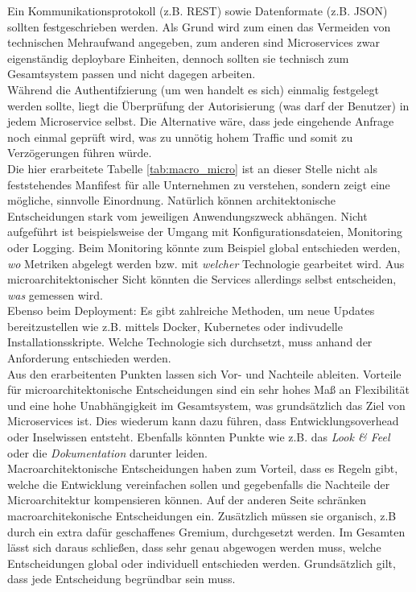 Ein Kommunikationsprotokoll (z.B. REST) sowie Datenformate (z.B. JSON) sollten festgeschrieben werden.\cite{rewe2019mic_ppp} \cite{wolff2018mic_praxis} Als Grund wird zum einen das Vermeiden von technischen Mehraufwand angegeben, zum anderen sind Microservices zwar eigenständig deploybare Einheiten, dennoch sollten sie technisch zum Gesamtsystem passen und nicht dagegen arbeiten. \\

Während die Authentifzierung (um wen handelt es sich) einmalig festgelegt werden sollte, liegt die Überprüfung der Autorisierung (was darf der Benutzer) in jedem Microservice selbst. Die Alternative wäre, dass jede eingehende Anfrage noch einmal geprüft wird, was zu unnötig hohem Traffic und somit zu Verzögerungen führen würde.  \\

Die hier erarbeitete Tabelle  \ref{tab:macro_micro}  ist an dieser Stelle nicht als feststehendes Manfifest für alle Unternehmen zu verstehen, sondern zeigt eine mögliche, sinnvolle Einordnung. Natürlich können architektonische Entscheidungen stark vom jeweiligen Anwendungszweck abhängen. Nicht aufgeführt ist beispielsweise der Umgang mit Konfigurationsdateien, Monitoring oder Logging. Beim Monitoring könnte zum Beispiel global entschieden werden, \textit{wo} Metriken abgelegt werden bzw. mit \textit{welcher} Technologie gearbeitet wird. Aus microarchitektonischer Sicht könnten die Services allerdings selbst entscheiden, \textit{was} gemessen wird.  \\

Ebenso beim Deployment: Es gibt zahlreiche Methoden, um neue Updates bereitzustellen wie z.B. mittels Docker, Kubernetes oder indivudelle Installationsskripte.\cite{wolff2018mic_praxis} Welche Technologie sich durchsetzt, muss anhand der Anforderung entschieden werden. \\

Aus den erarbeitenten Punkten lassen sich Vor- und Nachteile ableiten. Vorteile für microarchitektonische Entscheidungen sind ein sehr hohes Maß an Flexibilität und eine hohe Unabhängigkeit im Gesamtsystem, was grundsätzlich das Ziel von Microservices ist. Dies wiederum kann dazu führen, dass Entwicklungsoverhead oder Inselwissen entsteht. Ebenfalls könnten Punkte wie z.B. das \textit{Look \& Feel} oder die \textit{Dokumentation} darunter leiden.  \\

Macroarchitektonische Entscheidungen haben zum Vorteil, dass es Regeln gibt, welche die Entwicklung vereinfachen sollen und gegebenfalls die Nachteile der Microarchitektur kompensieren können. Auf der anderen Seite schränken macroarchitekonische Entscheidungen ein. Zusätzlich müssen sie organisch, z.B durch ein extra dafür geschaffenes Gremium, durchgesetzt werden.\cite{wolff2018mic_praxis} Im Gesamten lässt sich daraus schließen, dass sehr genau abgewogen werden muss, welche Entscheidungen global oder individuell entschieden werden. Grundsätzlich gilt, dass jede Entscheidung begründbar sein muss.    

